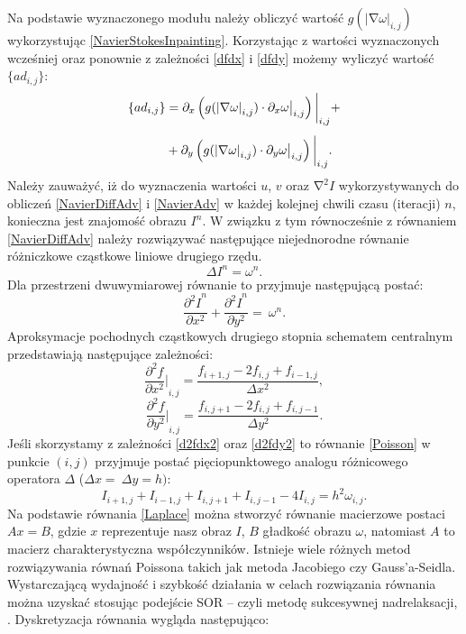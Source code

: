 \documentclass[a4paper,12pt,twoside,openany]{report}
\begin{document}
Na podstawie wyznaczonego modułu należy obliczyć wartość $g{\left({\left|\mathrm{\nabla }\omega \right|}_{i,j}\right)}$ wykorzystując \eqref{NavierStokesInpainting}. Korzystając z wartości wyznaczonych wcześniej oraz ponownie z zależności \eqref{dfdx} i \eqref{dfdy} możemy wyliczyć wartość $\{ad_{i,j}\} $:
\begin{align}
\{ad_{i,j}\} &= \partial_x \left( g(\left| \nabla\omega \right|_{i,j}) \cdot \partial_x \omega \big|_{i,j} \right) \bigg|_{i,j} \notag +\\[1ex]
&+ \partial_y \left( g(\left|\nabla\omega\right|_{i,j}) \cdot \partial_y \omega \big|_{i,j} \right)\bigg|_{i,j}.
\label{discreteAnisotropic}
\end{align}
Należy zauważyć, iż do wyznaczenia wartości $u$, $v$ oraz ${\mathrm{\nabla }}^2I$ wykorzystywanych do obliczeń \eqref{NavierDiffAdv} i \eqref{NavierAdv} w każdej kolejnej chwili czasu (iteracji) $n$, konieczna jest znajomość obrazu $I^n$. W związku z tym równocześnie z równaniem \eqref{NavierDiffAdv} należy rozwiązywać następujące niejednorodne równanie różniczkowe cząstkowe liniowe drugiego rzędu.
\begin{equation}
\Delta I^n={\omega }^n
\label{Poisson}
.
\end{equation}
Dla przestrzeni dwuwymiarowej równanie to przyjmuje następującą postać:
\begin{equation}
\frac{{{\partial }^2I}^n}{\partial x^2}+\frac{{{\partial }^2I}^n}{\partial y^2}=\ \omega^n
\label{Poisson2D}
.
\end{equation}
Aproksymacje pochodnych cząstkowych drugiego stopnia schematem centralnym przedstawiają następujące zależności:
\begin{equation}
{\frac{{\partial }^2f}{\partial x^2}\bigg|}_{i,j}\mathrm{=}\frac{f_{i+1,j}-2f_{i,j}+f_{i-1,j}}{\Delta x^2}
\label{d2fdx2}
,
\end{equation}
\begin{equation}
{\frac{{\partial }^2f}{\partial y^2}\bigg|}_{i,j}\mathrm{=}\frac{f_{i,j+1}-2f_{i,j}+f_{i,j-1}}{\Delta y^2}
\label{d2fdy2}
.
\end{equation}
Jeśli skorzystamy z zależności \eqref{d2fdx2} oraz \eqref{d2fdy2} to równanie \eqref{Poisson} w punkcie $(i,j)$ przyjmuje postać pięciopunktowego analogu różnicowego operatora $\Delta $ ($\Delta x=\ \Delta y=h)$:
\begin{equation}
I_{i+1,j}+I_{i-1,j}+I_{i,j+1}+I_{i,j-1}-4I_{i,j}=h^2{\omega }_{i,j}
\label{Laplace}
.
\end{equation}
Na podstawie równania \eqref{Laplace} można stworzyć równanie macierzowe postaci $Ax=B$, gdzie $x$ reprezentuje nasz obraz $I$, $B$ gładkość obrazu $\omega$, natomiast $A$ to macierz charakterystyczna współczynników. Istnieje wiele różnych metod rozwiązywania równań Poissona takich jak metoda Jacobiego czy Gauss'a-Seidla.  Wystarczającą wydajność i szybkość działania w celach rozwiązania równania można uzyskać stosując podejście SOR – czyli metodę sukcesywnej nadrelaksacji, \cite{blacksuccessive}. Dyskretyzacja równania wygląda następująco:
\end{document}
